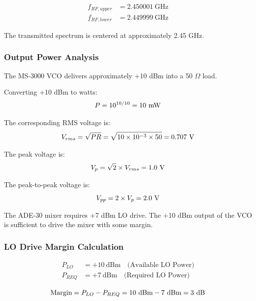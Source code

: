 \documentclass[12pt,a4paper]{report}
\begin{document}
	\begin{align*}
		f_{RF,upper} &= 2.450001\ \text{GHz} \\
		f_{RF,lower} &= 2.449999\ \text{GHz}
	\end{align*}
	
	The transmitted spectrum is centered at approximately 2.45 GHz.
	\subsubsection{Output Power Analysis}
	The MS-3000 VCO delivers approximately +10 dBm into a 50 $\Omega$ load.
	
	Converting +10 dBm to watts:
	\begingroup
	\setlength{\mathindent}{0pt}
	\begin{equation*}
		\hfill
		P = 10^{10/10} = 10\ \text{mW}
		\hfill
	\end{equation*}
	\endgroup
	
	The corresponding RMS voltage is:
	\begingroup
	\setlength{\mathindent}{0pt}
	\begin{equation*}
		\hfill
		V_{rms} = \sqrt{PR} = \sqrt{10 \times 10^{-3} \times 50} = 0.707\ \text{V}
		\hfill
	\end{equation*}
	\endgroup
	
	The peak voltage is:
	\begingroup
	\setlength{\mathindent}{0pt}
	\begin{equation*}
		\hfill
		V_p = \sqrt{2} \times V_{rms} = 1.0\ \text{V}
		\hfill
	\end{equation*}
	\endgroup
	
	The peak-to-peak voltage is:
	\begingroup
	\setlength{\mathindent}{0pt}
	\begin{equation*}
		\hfill
		V_{pp} = 2 \times V_p = 2.0\ \text{V}
		\hfill
	\end{equation*}
	\endgroup
	
	The ADE-30 mixer requires +7 dBm LO drive. The +10 dBm output of the VCO is sufficient to drive the mixer with some margin.
	
	\subsubsection{LO Drive Margin Calculation}
	\begin{align*}
		P_{LO} &= +10\ \text{dBm} \quad \text{(Available LO Power)} \\
		P_{REQ} &= +7\ \text{dBm} \quad \text{(Required LO Power)}
	\end{align*}
	
	\begingroup
	\setlength{\mathindent}{0pt}
	\begin{equation*}
		\hfill
		\text{Margin} = P_{LO} - P_{REQ} = 10\ \text{dBm} - 7\ \text{dBm} = 3\ \text{dB}
		\hfill
	\end{equation*}
	\endgroup
	
\end{document}
